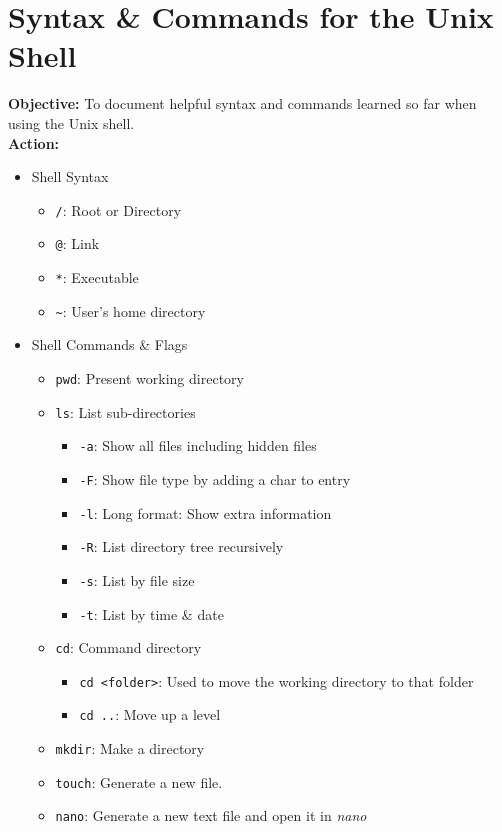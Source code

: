 \documentclass{article}
\begin{document}
\section{Syntax \& Commands for the Unix Shell}
\textbf{Objective:} To document helpful syntax and commands learned so far when using the Unix shell.\\
\textbf{Action:}
\begin{itemize}
    \item Shell Syntax
    \begin{itemize}
        \item \verb|/|: Root or Directory
        \item \verb|@|: Link
        \item \verb|*|: Executable
        \item \verb|~|: User's home directory
    \end{itemize}
    \item Shell Commands \& Flags
    \begin{itemize}
        \item \verb|pwd|: Present working directory
        \item \verb|ls|: List sub-directories
        \begin{itemize}
            \item \verb|-a|: Show all files including hidden files
            \item \verb|-F|: Show file type by adding a char to entry
            \item \verb|-l|: Long format: Show extra information
            \item \verb|-R|: List directory tree recursively
            \item \verb|-s|: List by file size
            \item \verb|-t|: List by time \& date
        \end{itemize}
        \item \verb|cd|: Command directory
        \begin{itemize}
            \item \verb|cd <folder>|: Used to move the working directory to that folder
            \item \verb|cd ..|: Move up a level
        \end{itemize}
        \item \verb|mkdir|: Make a directory
        \item \verb|touch|: Generate a new file.
        \item \verb|nano|: Generate a new text file and open it in \textit{nano}

\end{itemize}
\end{itemize}
\end{document}
